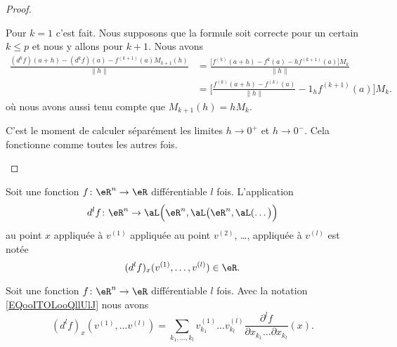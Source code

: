 \begin{proof}
\begin{subproof}
        Pour \( k=1\) c'est fait. Nous supposons que la formule soit correcte pour un certain \( k\leq p\) et nous y allons pour \( k+1\). Nous avons
        \begin{subequations}        \label{SUBEQSooUPLAooQhueCl}
            \begin{align}
            \frac{ (d^kf)(a+h)-(d^kf)(a)-f^{(k+1)}(a)M_{k+1}(h) }{ \| h \| }&=\frac{ \big[ f^{(k)}(a+h)-f^k(a)-hf^{(k+1)}(a) \big]M_k  }{ \| h \| }\\
                &=\big[ \frac{ f^{(k)}(a+h)-f^{(k)}(a) }{ \| h \| }-1_hf^{(k+1)}(a) \big]M_k.
            \end{align}
        \end{subequations}
        où nous avons aussi tenu compte que \( M_{k+1}(h)=hM_k\).

        C'est le moment de calculer séparément les limites \( h\to 0^+\) et \( h\to 0^-\). Cela fonctionne comme toutes les autres fois.
    \end{subproof}
\end{proof}

Soit une fonction \( f\colon \eR^n\to \eR\) différentiable \( l\) fois. L'application
\begin{equation}
    d^lf\colon \eR^n\to \aL\Big( \eR^n,\aL\big( \eR^n,\aL(\ldots \big) \Big)
\end{equation}
au point \( x\) appliquée à \( v^{(1)}\) appliquée au point \( v^{(2)}\), \ldots, appliquée à \( v^{(l)}\) est notée
\begin{equation}        \label{EQooITOLooQllUlJ}
    (d^lf)_x(v^{(1)},\ldots ,v^{(l)})\in \eR.
\end{equation}

\begin{proposition}     \label{PROPooQKZIooXTvkIr}
    Soit une fonction \( f\colon \eR^n\to \eR\) différentiable \( l\) fois. Avec la notation \eqref{EQooITOLooQllUlJ} nous avons
    \begin{equation}
        (d^lf)_x(v^{(1)},\ldots v^{(l)})=\sum_{k_1,\ldots, k_l}v^{(1)}_{k_1}\ldots v_{k_l}^{(l)}\frac{ \partial^lf }{ \partial x_{k_1}\ldots \partial x_{k_l} }(x).
    \end{equation}
\end{proposition}

